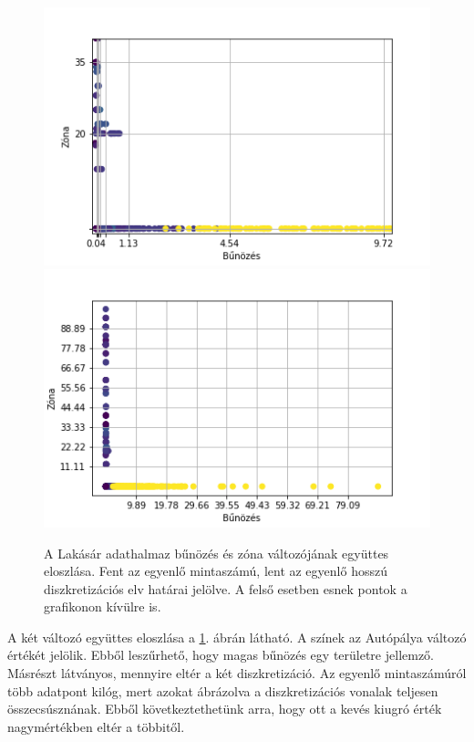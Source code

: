 \begin{figure}[htp]
    \centering
    \includegraphics[width=12cm]{figures/housing_0_1_sample.png} \\
    \includegraphics[width=12cm]{figures/housing_0_1_width.png}
    \caption{A Lakásár adathalmaz bűnözés és zóna változójának együttes eloszlása. Fent az egyenlő mintaszámú, lent az egyenlő hosszú diszkretizációs elv határai jelölve. A felső esetben esnek pontok a grafikonon kívülre is.}
    \label{fig:housing_eloszlas}
\end{figure}

A két változó együttes eloszlása a \ref{fig:housing_eloszlas}. ábrán látható. A színek az Autópálya változó értékét jelölik. Ebből leszűrhető, hogy magas bűnözés egy területre jellemző. Másrészt látványos, mennyire eltér a két diszkretizáció. Az egyenlő mintaszámúról több adatpont kilóg, mert azokat ábrázolva a diszkretizációs vonalak teljesen összecsúsznának. Ebből következtethetünk arra, hogy ott a kevés kiugró érték nagymértékben eltér a többitől.


